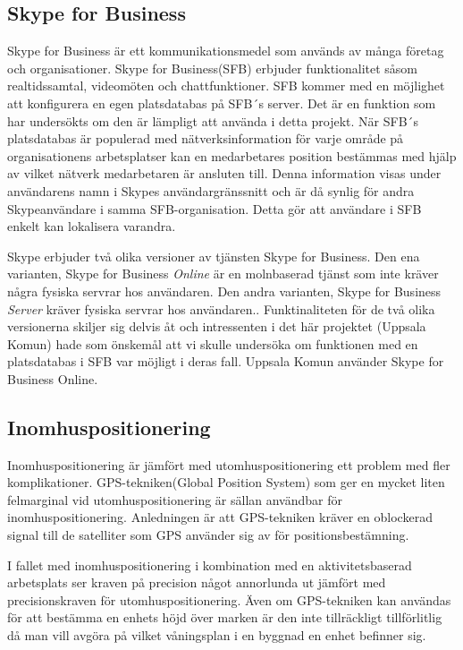 \documentclass[swedish, a4paper,12pt]{article}
\begin{document}
\subsection{Skype for Business}
Skype for Business är ett kommunikationsmedel som används av många företag och organisationer. Skype for Business(SFB) erbjuder funktionalitet såsom realtidssamtal, videomöten och chattfunktioner. SFB kommer med en möjlighet att konfigurera en egen platsdatabas på SFB´s server.\cite{Microsoft-Office} Det är en funktion som har undersökts om den är lämpligt att använda i detta projekt. När SFB´s platsdatabas är populerad med nätverksinformation för varje område på organisationens arbetsplatser kan en medarbetares position bestämmas med hjälp av vilket nätverk medarbetaren är ansluten till. Denna information visas under användarens namn i Skypes användargränssnitt och är då synlig för andra Skypeanvändare i samma SFB-organisation. Detta gör att användare i SFB enkelt kan lokalisera varandra.

Skype erbjuder två olika versioner av tjänsten Skype for Business. Den ena varianten, Skype for Business \textit{Online} är en molnbaserad tjänst som inte kräver några fysiska servrar hos användaren.\cite{SFBonline}
Den andra varianten, Skype for Business \textit{Server} kräver fysiska servrar hos användaren.\cite{SFBserver}. Funktinaliteten för de två olika versionerna skiljer sig delvis åt och intressenten i det här projektet (Uppsala Komun) hade som önskemål att vi skulle undersöka om funktionen med en platsdatabas i SFB var möjligt i deras fall. Uppsala Komun använder Skype for Business Online.

\subsection{Inomhuspositionering}
Inomhuspositionering är jämfört med utomhuspositionering ett problem med fler komplikationer. GPS-tekniken(Global Position System) som ger en mycket liten felmarginal vid utomhuspositionering är sällan användbar för inomhuspositionering. Anledningen är att GPS-tekniken kräver en oblockerad signal till de satelliter som GPS använder sig av för positionsbestämning. \cite{GPS_US_ACCURACY}

I fallet med inomhuspositionering i kombination med en aktivitetsbaserad arbetsplats ser kraven på precision något annorlunda ut jämfört med precisionskraven för utomhuspositionering. Även om GPS-tekniken kan användas för att bestämma en enhets höjd över marken är den inte tillräckligt tillförlitlig då man vill avgöra på vilket våningsplan i en byggnad en enhet befinner sig.
\end{document}
